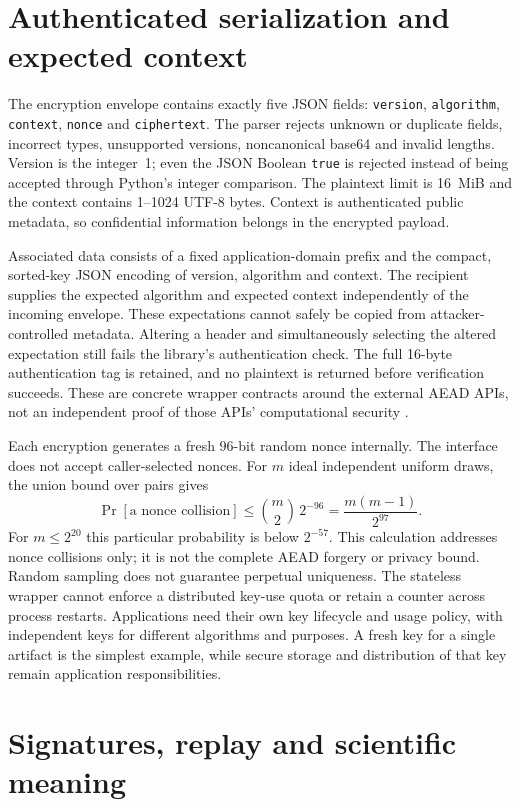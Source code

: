 \section{Authenticated serialization and expected context}

The encryption envelope contains exactly five JSON fields:
\texttt{version}, \texttt{algorithm}, \texttt{context}, \texttt{nonce} and
\texttt{ciphertext}. The parser rejects unknown or duplicate fields, incorrect
types, unsupported versions, noncanonical base64 and invalid lengths. Version is
the integer~1; even the JSON Boolean \texttt{true} is rejected instead of being
accepted through Python's integer comparison. The plaintext limit is 16~MiB and
the context contains 1--1024 UTF-8 bytes. Context is authenticated public metadata,
so confidential information belongs in the encrypted payload.

Associated data consists of a fixed application-domain prefix and the compact,
sorted-key JSON encoding of version, algorithm and context. The recipient supplies
the expected algorithm and expected context independently of the incoming
envelope. These expectations cannot safely be copied from attacker-controlled
metadata. Altering a header and simultaneously selecting the altered expectation
still fails the library's authentication check. The full 16-byte authentication
tag is retained, and no plaintext is returned before verification succeeds.
These are concrete wrapper contracts around the external AEAD APIs, not an
independent proof of those APIs' computational security \cite{CryptoAPI50AEAD}.

Each encryption generates a fresh 96-bit random nonce internally. The interface
does not accept caller-selected nonces. For $m$ ideal independent uniform draws,
the union bound over pairs gives
\[
 \Pr[\text{a nonce collision}]\leq
 \binom m2\,2^{-96}=\frac{m(m-1)}{2^{97}}.
\]
For $m\leq2^{20}$ this particular probability is below $2^{-57}$. This calculation
addresses nonce collisions only; it is not the complete AEAD forgery or privacy
bound. Random sampling does not guarantee perpetual uniqueness. The stateless
wrapper cannot enforce a distributed key-use quota or retain a counter across
process restarts. Applications need their own key lifecycle and usage policy,
with independent keys for different algorithms and purposes. A fresh key for a
single artifact is the simplest example, while secure storage and distribution
of that key remain application responsibilities.

\section{Signatures, replay and scientific meaning}

